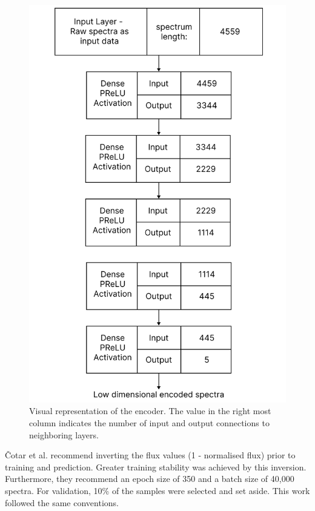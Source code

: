 \begin{figure}[!htb]
\centering
\includegraphics[scale=0.15]{figures/autoencoder diagram.png}
\caption{Visual representation of the encoder. The value in
the right most column indicates the number of input and output
connections to neighboring layers.}
\end{figure}

Čotar et al. recommend inverting the flux values (1 - normalised flux) prior to training and prediction. Greater training stability was achieved by this inversion. Furthermore, they recommend an epoch size of 350 and a batch size of 40,000 spectra. For validation, 10\% of the samples were selected and set aside. This work followed the same conventions. 

